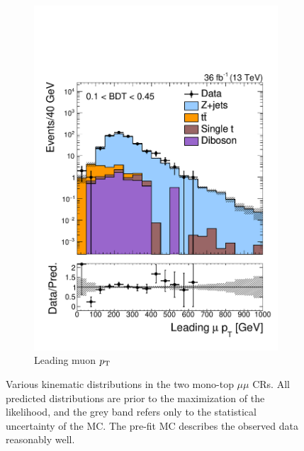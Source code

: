 \begin{figure}[]
\begin{center}
\begin{subfigure}[t]{0.49\textwidth}
            \includegraphics[width=\textwidth]{figures/monotop/prefit/dimuon_loose_looseLep1Pt_logy.pdf}
            \caption{Leading muon $p_\mathrm{T}$}
        \end{subfigure}
        \caption{Various kinematic distributions in the two mono-top $\mu\mu$ CRs.
                 All predicted distributions are prior to the maximization of the likelihood, and the grey band refers only to the statistical uncertainty of the MC.
                 The pre-fit MC describes the observed data reasonably well.
                 }
        \label{fig:mt:prefit_dimuon}
    \end{center}
\end{figure}

